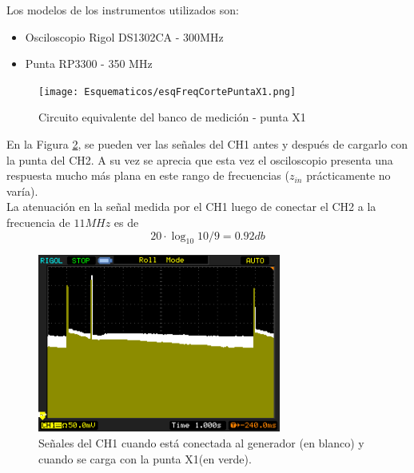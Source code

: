 \documentclass[a4paper,10pt]{article}
\begin{document}
		\indent Los modelos de los instrumentos utilizados son:
		
		\begin{itemize}
			\item Osciloscopio Rigol DS1302CA - 300MHz
			\item Punta RP3300 - 350 MHz
		\end{itemize}

		\begin{figure}[!htb]
			\centering
			\texttt{[image: Esquematicos/esqFreqCortePuntaX1.png]}
			\caption{Circuito equivalente del banco de medición - punta X1} 
			\label{esq002}
		\end{figure}

		\indent En la Figura \ref{img003}, se pueden ver las se\~nales del CH1
		antes y despu\'es de cargarlo con la punta del CH2. A su vez se 
		aprecia que esta vez el osciloscopio presenta una respuesta mucho más
		plana en este rango de frecuencias ($z_{in}$ prácticamente no varía). \\
		\indent La atenuación en la señal medida por el CH1 luego de conectar
		el CH2 a la frecuencia de $11 MHz$ es de 
		$$ 20\cdot \log_{10}10/9 = 0.92db $$
		
		\begin{figure}[!htb]
			\centering
			\includegraphics[width=8cm]
			{Imagenes/Mediciones instrumentos/NewFile4.png}
			\caption{Se\~nales del CH1 cuando est\'a conectada al generador 
			(en blanco) y cuando se carga con la punta X1(en verde).} 
			\label{img003}
		\end{figure}
		
\end{document}
